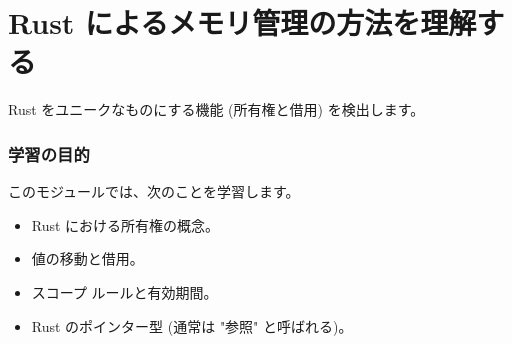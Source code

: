 \section{Rust によるメモリ管理の方法を理解する}

Rust をユニークなものにする機能 (所有権と借用) を検出します。

\subsubsection{学習の目的}

このモジュールでは、次のことを学習します。

\begin{itemize}
\item Rust における所有権の概念。
\item 値の移動と借用。
\item スコープ ルールと有効期間。
\item Rust のポインター型 (通常は "参照" と呼ばれる)。
\end{itemize}

